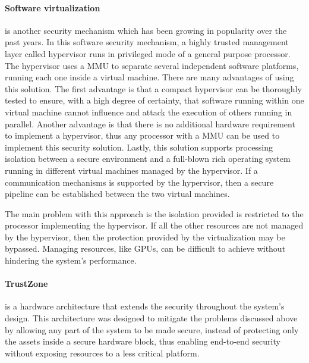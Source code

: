 \paragraph{\textbf{Software virtualization}} is another security mechanism which has been growing in popularity over the past years. In this software security mechanism, a highly trusted management layer called hypervisor runs in privileged mode of a general purpose processor. The hypervisor uses a \ac{MMU} to separate several independent software platforms, running each one inside a virtual machine. There are many advantages of using this solution. The first advantage is that a compact hypervisor can be thoroughly tested to ensure, with a high degree of certainty, that software running within one virtual machine cannot influence and attack the execution of others running in parallel. Another advantage is that there is no additional hardware requirement to implement a hypervisor, thus any processor with a \ac{MMU} can be used to implement this security solution. Lastly, this solution supports processing isolation between a secure environment and a full-blown rich operating system running in different virtual machines managed by the hypervisor. If a communication mechanisms is supported by the hypervisor, then a secure pipeline can be established between the two virtual machines.

The main problem with this approach is the isolation provided is restricted to the processor implementing the hypervisor. If all the other resources are not managed by the hypervisor, then the protection provided by the virtualization may be bypassed. Managing resources, like \ac{GPUs}, can be difficult to achieve without hindering the system's performance.


\paragraph{\textbf{TrustZone}} is a hardware architecture that extends the security throughout the system's design. This architecture was designed to mitigate the problems discussed above by allowing any part of the system to be made secure, instead of protecting only the assets inside a secure hardware block, thus enabling end-to-end security without exposing resources to a less critical platform.

